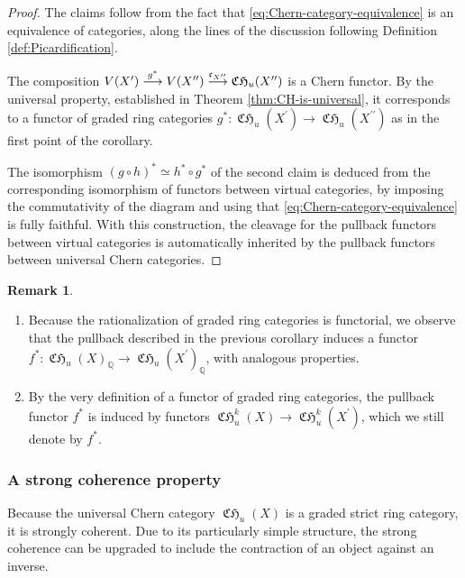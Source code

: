 \documentclass[11pt]{article}
\newcommand{\skpt}{\smallskip}
\newcommand\To[1]{\mathchoice{\xrightarrow{\kern1pt#1\kern1pt}}{\stackrel{#1}{\longrightarrow}}{}{}}
\theoremstyle{plain}
\theoremstyle{definition}
\newtheorem{remark}[theorem]{Remark}
\newcommand{\QBbb}{\mathbb Q}
\newcommand{\cfrak}{\mathfrak c}
\newcommand{\bis}{\prime\prime}
\DeclareMathOperator{\CHfrak}{\mathfrak{CH}}
\begin{document}
\begin{proof}
The claims follow from the fact that \eqref{eq:Chern-category-equivalence} is an equivalence of categories, along the lines of the discussion following Definition \ref{def:Picardification}.

The composition $V(X^{\prime})\To{g^{\ast}} V(X^{\bis})\To{\cfrak_{X^{\bis}}}\CHfrak_{u}(X^{\bis})$ is a Chern functor. By the universal property, established in Theorem \ref{thm:CH-is-universal}, it corresponds to a functor of graded ring categories $g^\ast \colon \CHfrak_{u}(X^{\prime}) \to \CHfrak_{u}(X^{\bis})$ as in the first point of the corollary.

The isomorphism $(g\circ h)^{\ast}\simeq h^{\ast}\circ g^{\ast}$ of the second claim is deduced from the corresponding isomorphism of functors between virtual categories, by imposing the commutativity of the diagram and using that \eqref{eq:Chern-category-equivalence} is fully faithful. With this construction, the cleavage for the pullback functors between virtual categories is automatically inherited by the pullback functors between universal Chern categories.
\end{proof}

\skpt
\begin{remark}
\begin{enumerate}\label{rem:pullback-chern}
\item Because the rationalization of graded ring categories is functorial, we observe that the pullback described in the previous corollary induces a functor $f^{\ast}\colon\CHfrak_{u}(X)_{\QBbb}\to\CHfrak_{u}(X^{\prime})_{\QBbb}$, with analogous properties.
\item By the very definition of a functor of graded ring categories, the pullback functor $f^{\ast}$ is induced by functors $\CHfrak^{k}_{u}(X)\to \CHfrak_{u}^{k}(X^{\prime})$, which we still denote by $f^{\ast}$.
\end{enumerate}
\end{remark}

\subsubsection{A strong coherence property}\label{subsubsec:coherence-property}
Because the universal Chern category $\CHfrak_{u}(X)$ is a graded strict ring category, it is strongly coherent. Due to its particularly simple structure, the strong coherence can be upgraded to include the contraction of an object against an inverse.
\end{document}

